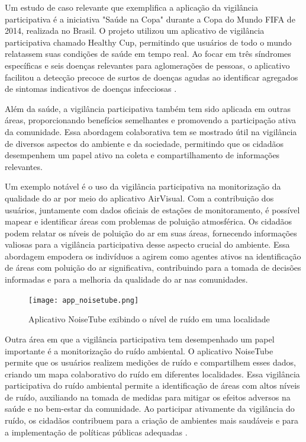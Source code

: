 Um estudo de caso relevante que exemplifica a aplicação da vigilância participativa é a iniciativa "Saúde na Copa" durante a Copa do Mundo FIFA de 2014, realizada no Brasil. O projeto utilizou um aplicativo de vigilância participativa chamado Healthy Cup, permitindo que usuários de todo o mundo relatassem suas condições de saúde em tempo real. Ao focar em três síndromes específicas e seis doenças relevantes para aglomerações de pessoas, o aplicativo facilitou a detecção precoce de surtos de doenças agudas ao identificar agregados de sintomas indicativos de doenças infecciosas \cite{2017_LealNeto}.

Além da saúde, a vigilância participativa também tem sido aplicada em outras áreas, proporcionando benefícios semelhantes e promovendo a participação ativa da comunidade. Essa abordagem colaborativa tem se mostrado útil na vigilância de diversos aspectos do ambiente e da sociedade, permitindo que os cidadãos desempenhem um papel ativo na coleta e compartilhamento de informações relevantes.

Um exemplo notável é o uso da vigilância participativa na monitorização da qualidade do ar por meio do aplicativo AirVisual. Com a contribuição dos usuários, juntamente com dados oficiais de estações de monitoramento, é possível mapear e identificar áreas com problemas de poluição atmosférica. Os cidadãos podem relatar os níveis de poluição do ar em suas áreas, fornecendo informações valiosas para a vigilância participativa desse aspecto crucial do ambiente. Essa abordagem empodera os indivíduos a agirem como agentes ativos na identificação de áreas com poluição do ar significativa, contribuindo para a tomada de decisões informadas e para a melhoria da qualidade do ar nas comunidades.

\begin{figure}[!htb]
	\caption{Aplicativo NoiseTube exibindo o nível de ruído em uma localidade}
	\label{fig:app_noisetube}
	\centering
	\texttt{[image: app\_noisetube.png]}
\end{figure}

Outra área em que a vigilância participativa tem desempenhado um papel importante é a monitorização do ruído ambiental. O aplicativo NoiseTube permite que os usuários realizem medições de ruído e compartilhem esses dados, criando um mapa colaborativo do ruído em diferentes localidades. Essa vigilância participativa do ruído ambiental permite a identificação de áreas com altos níveis de ruído, auxiliando na tomada de medidas para mitigar os efeitos adversos na saúde e no bem-estar da comunidade. Ao participar ativamente da vigilância do ruído, os cidadãos contribuem para a criação de ambientes mais saudáveis e para a implementação de políticas públicas adequadas \cite{2010_Arnand}.

